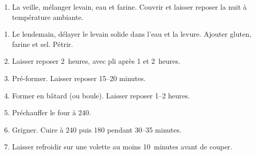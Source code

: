 

\begin{ingredients}
\end{ingredients}

\begin{recipe}
  \begin{enumerate}

  \item La veille, mélanger levain, eau et farine.  Couvrir et laisser
    reposer la nuit à température ambiante.

  \end{enumerate}
\end{recipe}


\begin{ingredients}
\end{ingredients}

\begin{recipe}
  \begin{enumerate}

  \item Le lendemain, délayer le levain solide dans l'eau et la
    levure.  Ajouter gluten, farine et sel.  Pétrir.

  \item Laisser reposer 2$\,$\fracH{} heures, avec pli après 1 et
    2~heures.

  \item Pré-former.  Laisser reposer 15--20 minutes.

  \item Former en bâtard (ou boule).  Laisser reposer 1\fracH--2
    heures.

  \item Préchauffer le four à 240\degreeC.

  \item Grigner.  Cuire à 240\degreeC{} puis 180\degreeC{} pendant
    30--35 minutes.

  \item Laisser refroidir sur une volette au moins 10~minutes avant de
    couper.

  \end{enumerate}
\end{recipe}

